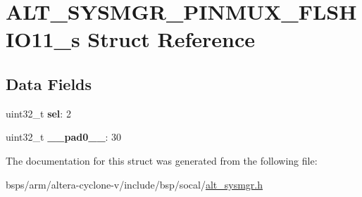 \hypertarget{structALT__SYSMGR__PINMUX__FLSHIO11__s}{}\section{A\+L\+T\+\_\+\+S\+Y\+S\+M\+G\+R\+\_\+\+P\+I\+N\+M\+U\+X\+\_\+\+F\+L\+S\+H\+I\+O11\+\_\+s Struct Reference}
\label{structALT__SYSMGR__PINMUX__FLSHIO11__s}
\subsection*{Data Fields}
\begin{DoxyCompactItemize}
\item 
\mbox{\label{structALT__SYSMGR__PINMUX__FLSHIO11__s_ac25e3167b150eb6eef2af7e1cbb4fcc0}} 
uint32\+\_\+t {\bfseries sel}\+: 2
\item 
\mbox{\label{structALT__SYSMGR__PINMUX__FLSHIO11__s_a5208d74bf8554815f3555beb1224f8c8}} 
uint32\+\_\+t {\bfseries \+\_\+\+\_\+pad0\+\_\+\+\_\+}\+: 30
\end{DoxyCompactItemize}


The documentation for this struct was generated from the following file\+:\begin{DoxyCompactItemize}
\item 
bsps/arm/altera-\/cyclone-\/v/include/bsp/socal/\mbox{\hyperlink{alt__sysmgr_8h}{alt\+\_\+sysmgr.\+h}}\end{DoxyCompactItemize}
